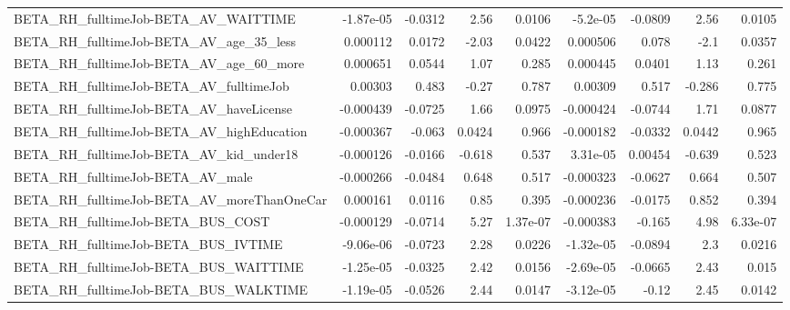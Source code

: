 \begin{tabular}{lrrrrrrrr}
BETA\_RH\_fulltimeJob-BETA\_AV\_WAITTIME               &   -1.87e-05 &      -0.0312 &     2.56 &   0.0106 &   -5.2e-05 &     -0.0809 &         2.56 &        0.0105 \\
BETA\_RH\_fulltimeJob-BETA\_AV\_age\_35\_less            &    0.000112 &       0.0172 &    -2.03 &   0.0422 &   0.000506 &       0.078 &         -2.1 &        0.0357 \\
BETA\_RH\_fulltimeJob-BETA\_AV\_age\_60\_more            &    0.000651 &       0.0544 &     1.07 &    0.285 &   0.000445 &      0.0401 &         1.13 &         0.261 \\
BETA\_RH\_fulltimeJob-BETA\_AV\_fulltimeJob            &     0.00303 &        0.483 &    -0.27 &    0.787 &    0.00309 &       0.517 &       -0.286 &         0.775 \\
BETA\_RH\_fulltimeJob-BETA\_AV\_haveLicense            &   -0.000439 &      -0.0725 &     1.66 &   0.0975 &  -0.000424 &     -0.0744 &         1.71 &        0.0877 \\
BETA\_RH\_fulltimeJob-BETA\_AV\_highEducation          &   -0.000367 &       -0.063 &   0.0424 &    0.966 &  -0.000182 &     -0.0332 &       0.0442 &         0.965 \\
BETA\_RH\_fulltimeJob-BETA\_AV\_kid\_under18            &   -0.000126 &      -0.0166 &   -0.618 &    0.537 &   3.31e-05 &     0.00454 &       -0.639 &         0.523 \\
BETA\_RH\_fulltimeJob-BETA\_AV\_male                   &   -0.000266 &      -0.0484 &    0.648 &    0.517 &  -0.000323 &     -0.0627 &        0.664 &         0.507 \\
BETA\_RH\_fulltimeJob-BETA\_AV\_moreThanOneCar         &    0.000161 &       0.0116 &     0.85 &    0.395 &  -0.000236 &     -0.0175 &        0.852 &         0.394 \\
BETA\_RH\_fulltimeJob-BETA\_BUS\_COST                  &   -0.000129 &      -0.0714 &     5.27 & 1.37e-07 &  -0.000383 &      -0.165 &         4.98 &      6.33e-07 \\
BETA\_RH\_fulltimeJob-BETA\_BUS\_IVTIME                &   -9.06e-06 &      -0.0723 &     2.28 &   0.0226 &  -1.32e-05 &     -0.0894 &          2.3 &        0.0216 \\
BETA\_RH\_fulltimeJob-BETA\_BUS\_WAITTIME              &   -1.25e-05 &      -0.0325 &     2.42 &   0.0156 &  -2.69e-05 &     -0.0665 &         2.43 &         0.015 \\
BETA\_RH\_fulltimeJob-BETA\_BUS\_WALKTIME              &   -1.19e-05 &      -0.0526 &     2.44 &   0.0147 &  -3.12e-05 &       -0.12 &         2.45 &        0.0142 \\

\end{tabular}
